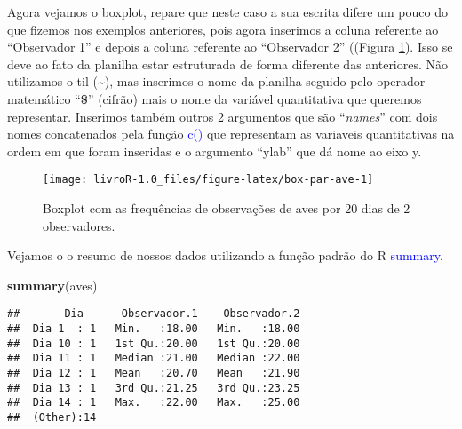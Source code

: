 \documentclass[14pt,titlepage, oneside, openany, a4paper]{book}
\newenvironment{Shaded}{\begin{snugshade}}{\end{snugshade}}
\newcommand{\DataTypeTok}[1]{\textcolor[rgb]{0.13,0.29,0.53}{#1}}
\newcommand{\FloatTok}[1]{\textcolor[rgb]{0.00,0.00,0.81}{#1}}
\newcommand{\KeywordTok}[1]{\textcolor[rgb]{0.13,0.29,0.53}{\textbf{#1}}}
\newcommand{\NormalTok}[1]{#1}
\newcommand{\OperatorTok}[1]{\textcolor[rgb]{0.81,0.36,0.00}{\textbf{#1}}}
\newcommand{\StringTok}[1]{\textcolor[rgb]{0.31,0.60,0.02}{#1}}
\begin{document}
Agora vejamos o boxplot, repare que neste caso a sua escrita difere um pouco do que fizemos nos exemplos anteriores, pois agora inserimos a coluna referente ao ``Observador 1'' e depois a coluna referente ao ``Observador 2'' ((Figura \ref{fig:box-par-ave}). Isso se deve ao fato da planilha estar estruturada de forma diferente das anteriores. Não utilizamos o til (\textasciitilde{}), mas inserimos o nome da planilha seguido pelo operador matemático ``\textbf{\$}'' (cifrão) mais o nome da variável quantitativa que queremos representar. Inserimos também outros 2 argumentos que são ``\emph{names}'' com dois nomes concatenados pela função \textcolor{blue}{c()} que representam as variaveis quantitativas na ordem em que foram inseridas e o argumento ``ylab'' que dá nome ao eixo y.

\begin{Shaded}
\end{Shaded}

\begin{figure}[H]

{\centering \texttt{[image: livroR-1.0\_files/figure-latex/box-par-ave-1]} 

}

\caption{Boxplot com as frequências de observações de aves por 20 dias de 2 observadores.}\label{fig:box-par-ave}
\end{figure}

Vejamos o o resumo de nossos dados utilizando a função padrão do R \textcolor{blue}{summary}.

\begin{Shaded}
\begin{Highlighting}[]
\KeywordTok{summary}\NormalTok{(aves)}
\end{Highlighting}
\end{Shaded}

\begin{verbatim}
##       Dia      Observador.1    Observador.2  
##  Dia 1  : 1   Min.   :18.00   Min.   :18.00  
##  Dia 10 : 1   1st Qu.:20.00   1st Qu.:20.00  
##  Dia 11 : 1   Median :21.00   Median :22.00  
##  Dia 12 : 1   Mean   :20.70   Mean   :21.90  
##  Dia 13 : 1   3rd Qu.:21.25   3rd Qu.:23.25  
##  Dia 14 : 1   Max.   :22.00   Max.   :25.00  
##  (Other):14
\end{verbatim}
\end{document}
